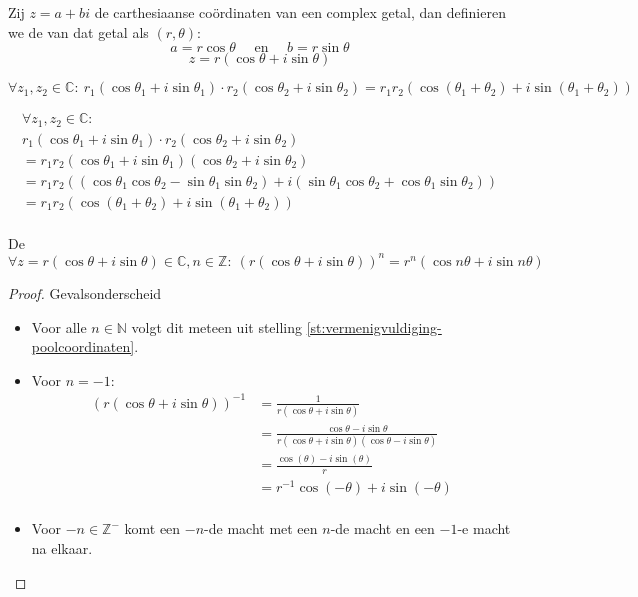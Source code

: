 \documentclass[main.tex]{subfiles}
\begin{document}
\begin{de}
  Zij $z = a+bi$ de carthesiaanse co\"ordinaten van een complex getal, dan definieren we de  van dat getal als $(r,\theta)$:
  \[ a = r \cos \theta \quad\text{ en }\quad b = r\sin \theta \]
  \[ z = r(\cos \theta + i \sin \theta)  \]
\end{de}

\begin{st}
  \label{st:vermenigvuldiging-poolcoordinaten}
  \[
  \forall z_{1},z_{2} \in \mathbb{C}:\ 
  r_{1}(\cos \theta_{1} + i \sin \theta_{1}) \cdot r_{2}(\cos \theta_{2} + i \sin \theta_{2})
  = r_{1}r_{2}\left(\cos(\theta_{1}+\theta_{2}) + i\sin(\theta_{1}+\theta_{2})\right)
  \]
  
  \[ 
  \begin{array}{l}
    \forall z_{1},z_{2} \in \mathbb{C}:\\
    r_{1}(\cos \theta_{1} + i \sin \theta_{1}) \cdot r_{2}(\cos \theta_{2} + i \sin \theta_{2})\\
    = r_{1}r_{2} (\cos \theta_{1} + i \sin \theta_{1})(\cos \theta_{2} + i \sin \theta_{2})\\
    = r_{1}r_{2} \left( \left(\cos \theta_{1}\cos \theta_{2} -\sin \theta_{1}\sin \theta_{2}\right)+ i\left( \sin \theta_{1}\cos \theta_{2} + \cos \theta_{1}\sin \theta_{2}\right)  \right)\\
    = r_{1}r_{2}\left(\cos(\theta_{1}+\theta_{2}) + i\sin(\theta_{1}+\theta_{2})\right)\\
  \end{array}
  \]
\end{st}

\begin{st}
  De \\
  \[ \forall z = r(\cos \theta + i \sin \theta) \in \mathbb{C}, n\in \mathbb{Z}:\ (r(\cos \theta + i \sin \theta))^{n} = r^{n}(\cos n\theta + i \sin n\theta)\]

  \begin{proof}
    Gevalsonderscheid
    \begin{itemize}
    \item Voor alle $n\in \mathbb{N}$ volgt dit meteen uit stelling
      \ref{st:vermenigvuldiging-poolcoordinaten}.
    \item Voor $n=-1$:
      \[
      \begin{array}{rl}
        (r(\cos \theta + i \sin \theta))^{-1}
        &= \frac{1}{r(\cos \theta + i \sin \theta)}\\
        &= \frac{\cos \theta - i \sin \theta}{r(\cos \theta + i \sin \theta)(\cos \theta - i \sin \theta)}\\
        &= \frac{\cos(\theta) - i\sin(\theta)}{r}\\
        &= r^{-1}\cos(-\theta) + i\sin(-\theta)\\
      \end{array}
      \]
    \item Voor $-n\in \mathbb{Z}^{-}$ komt een $-n$-de macht met een $n$-de macht en een $-1$-e macht na elkaar.
    \end{itemize}
  \end{proof}
\end{st}
\end{document}
